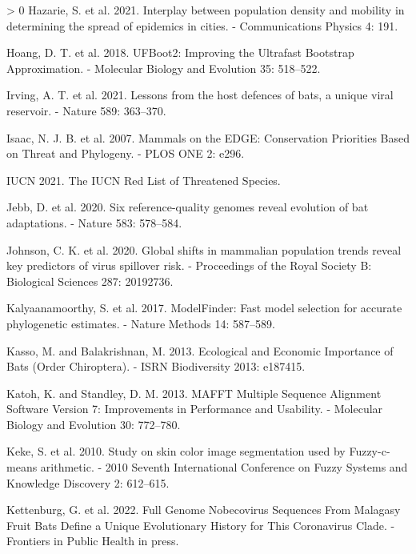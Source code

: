 \documentclass[11pt]{article}
\newlength{\cslhangindent}
\newenvironment{CSLReferences}[3] %
 {%
  \setlength{\parindent}{0pt}
  \ifodd #1 \everypar{\setlength{\hangindent}{\cslhangindent}}\ignorespaces\fi
  \ifnum #2 > 0
  \setlength{\parskip}{#2\baselineskip}
  \fi
 }%
 {}
\begin{document}
\begin{CSLReferences}{1}{0}
\leavevmode\hypertarget{ref-Hazarie2021IntPop}{}%
Hazarie, S. et al. 2021. Interplay between population density and
mobility in determining the spread of epidemics in cities. -
Communications Physics 4: 191.

\leavevmode\hypertarget{ref-Hoang2018UfbImp}{}%
Hoang, D. T. et al. 2018. UFBoot2: Improving the Ultrafast Bootstrap
Approximation. - Molecular Biology and Evolution 35: 518--522.

\leavevmode\hypertarget{ref-Irving2021LesHos}{}%
Irving, A. T. et al. 2021. Lessons from the host defences of bats, a
unique viral reservoir. - Nature 589: 363--370.

\leavevmode\hypertarget{ref-Isaac2007MamEdg}{}%
Isaac, N. J. B. et al. 2007. Mammals on the EDGE: Conservation
Priorities Based on Threat and Phylogeny. - PLOS ONE 2: e296.

\leavevmode\hypertarget{ref-IUCN2021IucRed}{}%
IUCN 2021. The IUCN Red List of Threatened Species.

\leavevmode\hypertarget{ref-Jebb2020SixRef}{}%
Jebb, D. et al. 2020. Six reference-quality genomes reveal evolution of
bat adaptations. - Nature 583: 578--584.

\leavevmode\hypertarget{ref-Johnson2020GloShi}{}%
Johnson, C. K. et al. 2020. Global shifts in mammalian population trends
reveal key predictors of virus spillover risk. - Proceedings of the
Royal Society B: Biological Sciences 287: 20192736.

\leavevmode\hypertarget{ref-Kalyaanamoorthy2017ModFas}{}%
Kalyaanamoorthy, S. et al. 2017. ModelFinder: Fast model selection for
accurate phylogenetic estimates. - Nature Methods 14: 587--589.

\leavevmode\hypertarget{ref-Kasso2013EcoEco}{}%
Kasso, M. and Balakrishnan, M. 2013. Ecological and Economic Importance
of Bats (Order Chiroptera). - ISRN Biodiversity 2013: e187415.

\leavevmode\hypertarget{ref-Katoh2013MafMul}{}%
Katoh, K. and Standley, D. M. 2013. MAFFT Multiple Sequence Alignment
Software Version 7: Improvements in Performance and Usability. -
Molecular Biology and Evolution 30: 772--780.

\leavevmode\hypertarget{ref-Keke2010StuSki}{}%
Keke, S. et al. 2010. Study on skin color image segmentation used by
Fuzzy-c-means arithmetic. - 2010 Seventh International Conference on
Fuzzy Systems and Knowledge Discovery 2: 612--615.

\leavevmode\hypertarget{ref-Kettenburg2022FulGen}{}%
Kettenburg, G. et al. 2022. Full Genome Nobecovirus Sequences From
Malagasy Fruit Bats Define a Unique Evolutionary History for This
Coronavirus Clade. - Frontiers in Public Health in press.


\end{CSLReferences}
\end{document}
